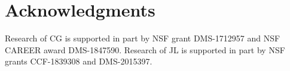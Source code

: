 
\section*{Acknowledgments}

Research of CG is supported in part by NSF grant DMS-1712957 and NSF CAREER award DMS-1847590. Research of JL is supported in part by NSF grants CCF-1839308 and DMS-2015397.
